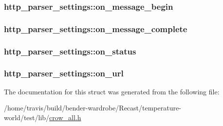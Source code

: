 \hypertarget{structhttp__parser__settings_ac44144daecc8e8adbd477b7e6a794e26}{
\subsubsection[{on\-\_\-message\-\_\-begin}]{ http\-\_\-parser\-\_\-settings\-::on\-\_\-message\-\_\-begin}}\label{structhttp__parser__settings_ac44144daecc8e8adbd477b7e6a794e26}
\hypertarget{structhttp__parser__settings_afdd5beef93a4a7b32bc61ae088da64d2}{
\subsubsection[{on\-\_\-message\-\_\-complete}]{ http\-\_\-parser\-\_\-settings\-::on\-\_\-message\-\_\-complete}}\label{structhttp__parser__settings_afdd5beef93a4a7b32bc61ae088da64d2}
\hypertarget{structhttp__parser__settings_a6d0f0203f3461a8889ad471de119c993}{
\subsubsection[{on\-\_\-status}]{ http\-\_\-parser\-\_\-settings\-::on\-\_\-status}}\label{structhttp__parser__settings_a6d0f0203f3461a8889ad471de119c993}
\hypertarget{structhttp__parser__settings_a9c24dfa900b49bf3439bbfba572b42fb}{
\subsubsection[{on\-\_\-url}]{ http\-\_\-parser\-\_\-settings\-::on\-\_\-url}}\label{structhttp__parser__settings_a9c24dfa900b49bf3439bbfba572b42fb}


The documentation for this struct was generated from the following file\-:\begin{DoxyCompactItemize}
\item 
/home/travis/build/bender-\/wardrobe/\-Recast/temperature-\/world/test/lib/\hyperlink{crow__all_8h}{crow\-\_\-all.\-h}\end{DoxyCompactItemize}
